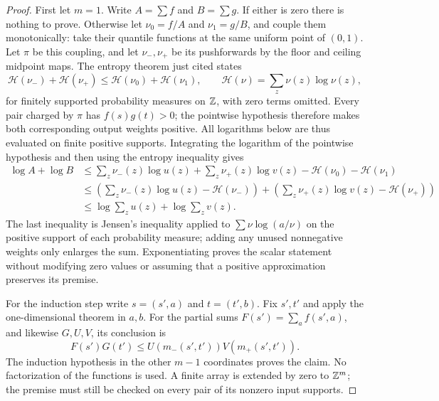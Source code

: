 \begin{proof}
First let $m=1$.  Write $A=\sum f$ and $B=\sum g$.
If either is zero there is nothing to prove.  Otherwise let
$\nu_0=f/A$ and $\nu_1=g/B$, and couple them monotonically: take
their quantile functions at the same uniform point of $(0,1)$.
Let $\pi$ be this coupling, and let $\nu_-,\nu_+$ be its pushforwards
by the floor and ceiling midpoint maps.  The entropy theorem just
cited states
\[
 \mathcal H(\nu_-)+\mathcal H(\nu_+)
 \le\mathcal H(\nu_0)+\mathcal H(\nu_1),
 \qquad \mathcal H(\nu)=\sum_z\nu(z)\log\nu(z),
\]
for finitely supported probability measures on $\mathbb Z$, with zero terms
omitted.  Every pair charged by $\pi$ has $f(s)g(t)>0$; the
pointwise hypothesis therefore makes both corresponding output weights
positive.  All logarithms below are thus evaluated on finite positive
supports.  Integrating the logarithm of the pointwise hypothesis and
then using the entropy inequality gives
\begin{align*}
 \log A+\log B
 &\le\sum_z\nu_-(z)\log u(z)+\sum_z\nu_+(z)\log v(z)
            -\mathcal H(\nu_0)-\mathcal H(\nu_1)\\
 &\le\left(\sum_z\nu_-(z)\log u(z)-\mathcal H(\nu_-)\right)
     +\left(\sum_z\nu_+(z)\log v(z)-\mathcal H(\nu_+)\right)\\
 &\le\log\sum_z u(z)+\log\sum_z v(z).
\end{align*}
The last inequality is Jensen's inequality applied to
$\sum\nu\log(a/\nu)$ on the positive support of each probability
measure; adding any unused nonnegative weights only enlarges the sum.
Exponentiating proves the scalar statement without modifying zero
values or assuming that a positive approximation preserves its premise.

For the induction step write $s=(s',a)$ and $t=(t',b)$.  Fix $s',t'$
and apply the one-dimensional theorem in $a,b$.  For the partial sums
$F(s')=\sum_a f(s',a)$, and likewise $G,U,V$, its conclusion is
\[
 F(s')G(t')\leq
 U(m_-(s',t'))V(m_+(s',t')).
\]
The induction hypothesis in the other $m-1$ coordinates proves the
claim.  No factorization of the functions is used.  A finite array is
extended by zero to $\mathbb Z^m$; the premise must still be checked on every
pair of its nonzero input supports.
\end{proof}

